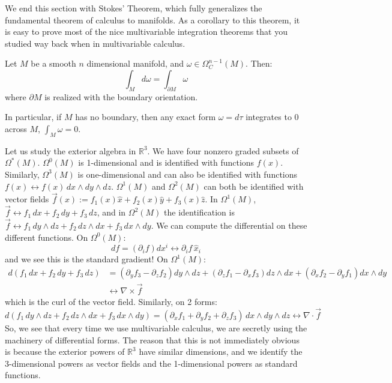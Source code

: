 We end this section with Stokes' Theorem, which fully generalizes the fundamental theorem of calculus to manifolds. 
As a corollary to this theorem, it is easy to prove most of the nice multivariable integration theorems that you studied way 
back when in multivariable calculus.
\begin{theorem}
	Let $M$ be a smooth $n$ dimensional manifold, and $\omega\in\Omega_C^{n - 1}(M)$. Then:
	\begin{equation}
		\int_M d\omega = \int_{\partial M}\omega
	\end{equation}
	where $\partial M$ is realized with the boundary orientation.
\end{theorem}

In particular, if $M$ has no boundary, then any exact form $\omega = d\tau$ integrates to 0 across $M$, $\int_M \omega = 0$. 
\begin{example}
	Let us study the exterior algebra in $\mathbb R^3$. We have four nonzero graded subsets of $\Omega^*(M)$. 
	$\Omega^0(M)$ is 1-dimensional and is identified with functions $f(x)$. Similarly, $\Omega^3(M)$ is 
	one-dimensional and can also be identified with functions $f(x)\leftrightarrow f(x)\,dx\wedge dy\wedge dz$. 
	$\Omega^1(M)$ and $\Omega^2(M)$ can both be identified with vector fields $\vec f(x) := f_1(x)\hat x + f_2(x)\hat y + 
	f_3(x)\hat z$. In $\Omega^1(M)$, $\vec f\leftrightarrow f_1\,dx + f_2\,dy + f_3\,dz$, and in $\Omega^2(M)$ 
	the identification is $\vec f\leftrightarrow f_1 \,dy\wedge dz + f_2\, dz\wedge dx + f_3\, dx\wedge dy$. We can compute 
	the differential on these different functions. On $\Omega^0(M)$:
	\begin{equation}
		df = (\partial_i f)dx^i\leftrightarrow \partial_i f\,\hat x_i
	\end{equation}
	and we see this is the standard gradient! On $\Omega^1(M)$:
	\begin{align}
		d(f_1\,dx + f_2\, dy + f_3\, dz) &= \left(\partial_y f_3 - \partial_z f_2\right)dy\wedge dz + \left(\partial_z f_1 - 
		\partial_x f_3\right)dz\wedge dx + \left(\partial_x f_2-\partial_y f_1\right)dx\wedge dy \nonumber\\
		&\leftrightarrow\nabla\times\vec f
	\end{align}
	which is the curl of the vector field. Similarly, on 2 forms:
	\begin{equation}
		d(f_1\,dy\wedge dz + f_2\,dz\wedge dx + f_3\,dx\wedge dy) = (\partial_x f_1 + \partial_y f_2 + \partial_z f_3)\,
		dx\wedge dy\wedge dz \leftrightarrow\nabla\cdot\vec f
	\end{equation}
	So, we see that every time we use multivariable calculus, we are secretly using the machinery of differential forms. 
	The reason that this is not immediately obvious is because the exterior powers of $\mathbb R^3$ have similar 
	dimensions, and we identify the 3-dimensional powers as vector fields and the 1-dimensional powers as standard
	functions. 
\end{example}

